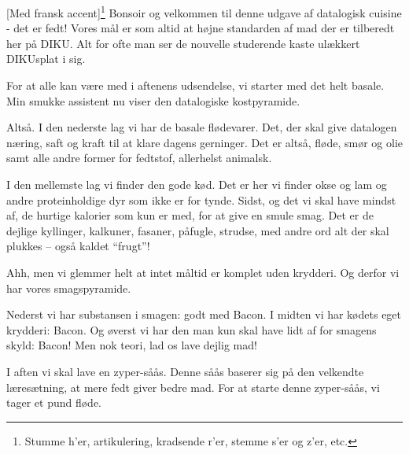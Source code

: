 \documentclass[a4paper,11pt]{article}
\begin{document}
  
\begin{sketch}


[Med fransk accent]\footnote{Stumme h'er, artikulering, kradsende r'er, stemme s'er og z'er, etc.} Bonsoir og velkommen til denne udgave af
datalogisk cuisine - det er fedt! Vores mål er som altid at højne standarden af mad
der er tilberedt her på DIKU. Alt for ofte man ser de nouvelle
studerende kaste ulækkert DIKUsplat i sig.

 For at alle kan være med i aftenens udsendelse, vi starter med
det helt basale. Min smukke assistent nu viser den datalogiske kostpyramide.


 Altså. I den nederste lag vi har de basale flødevarer. Det, der skal give 
datalogen næring, saft og kraft til at klare dagens gerninger. Det er altså, fløde, smør 
og olie samt alle andre former for fedtstof, allerhelst animalsk.

 I den mellemste lag 
vi finder den gode kød. Det er her vi finder okse og lam og andre proteinholdige dyr som 
ikke er for tynde. 
 Sidst, og det vi skal have mindst af, de hurtige kalorier som kun er 
med, for at give en smule smag. Det er de dejlige kyllinger, kalkuner, fasaner, påfugle, 
strudse, med andre ord alt der skal plukkes -- også kaldet ``frugt''!


 Ahh, men vi glemmer helt at intet måltid er komplet uden krydderi. Og derfor vi har 
vores smagspyramide.


 Nederst vi har substansen i smagen: godt med Bacon. I midten vi har kødets eget 
krydderi: Bacon. Og øverst vi har den man kun skal have lidt af for smagens skyld: Bacon!
Men nok teori, lad os lave dejlig mad!

 I aften vi skal lave en zyper-såås. Denne såås baserer sig på den velkendte 
læresætning, at mere fedt giver bedre mad. For at starte denne zyper-såås, vi tager et pund 
fløde. 


\end{sketch}
\end{document}
